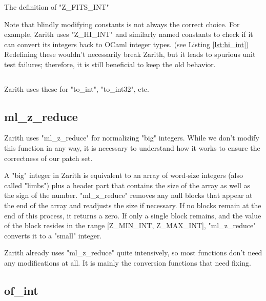 \documentclass{scrartcl}
\begin{document}

\begin{listing}[ht]
\inputminted[linenos, firstline=161, lastline=161]{c}{caml_z.c}
\caption{The definition of "Z\_FITS\_INT"}
\label{lst:maxmin_int}
\end{listing}

Note that blindly modifying constants is not always the correct choice. For example, Zarith uses "Z\_HI\_INT" and similarly named constants to check if it can convert its integers back to OCaml integer types. (see Listing \ref{lst:hi_int}) Redefining these wouldn't necessarily break Zarith, but it leads to spurious unit test failures; therefore, it is still beneficial to keep the old behavior.

\begin{listing}[ht]
\inputminted[linenos, firstline=183, lastline=188]{c}{caml_z.c}
\caption{Zarith uses these for "to\_int", "to\_int32", etc.}
\label{lst:hi_int}
\end{listing}

\subsection{ml\_z\_reduce}

Zarith uses "ml\_z\_reduce" for normalizing "big" integers. While we don't modify this function in any way, it is necessary to understand how it works to ensure the correctness of our patch set.

A "big" integer in Zarith is equivalent to an array of word-size integers (also called "limbs") plus a header part that contains the size of the array as well as the sign of the number. "ml\_z\_reduce" removes any null blocks that appear at the end of the array and readjusts the size if necessary. If no blocks remain at the end of this process, it returns a zero. If only a single block remains, and the value of the block resides in the range [Z\_MIN\_INT, Z\_MAX\_INT], "ml\_z\_reduce" converts it to a "small" integer.

Zarith already uses "ml\_z\_reduce" quite intensively, so most functions don't need any modifications at all. It is mainly the conversion functions that need fixing.

\subsection{of\_int}
\end{document}
